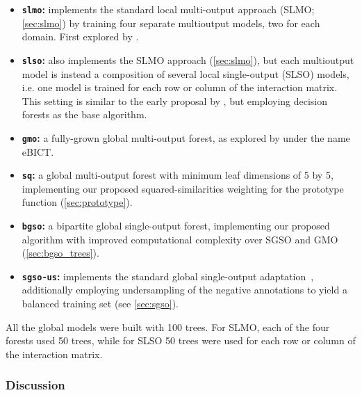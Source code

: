 \begin{itemize}
    \item \textbf{\texttt{slmo}:} implements the standard local multi-output approach (SLMO; \autoref{sec:slmo}) by training four separate multioutput models, two for each domain. First explored by .
    \item \textbf{\texttt{slso}:} also implements the SLMO approach (\autoref{sec:slmo}), but each multioutput model is instead a composition of several local single-output (SLSO) models, i.e. one model is trained for each row or column of the interaction matrix. This setting is similar to the early proposal by , but employing decision forests as the base algorithm.
    \item \textbf{\texttt{gmo}:} a fully-grown global multi-output forest, as explored by  under the name eBICT.
    \item \textbf{\texttt{sq}:} a global multi-output forest with minimum leaf dimensions of 5 by 5, implementing our proposed squared-similarities weighting for the prototype function (\autoref{sec:prototype}). %
    \item \textbf{\texttt{bgso}:} a bipartite global single-output forest, implementing our proposed algorithm with improved computational complexity over SGSO and GMO (\autoref{sec:bgso_trees}).
    \item \textbf{\texttt{sgso-us}:} implements the standard global single-output adaptation~\cite{schrynemackers2015classifying}, additionally employing undersampling of the negative annotations to yield a balanced training set (see \autoref{sec:sgso}).  %
\end{itemize}

All the global models were built with 100 trees. For SLMO, each of the four forests used 50 trees, while for SLSO 50 trees were used for each row or column of the interaction matrix.

\subsubsection{Discussion}

